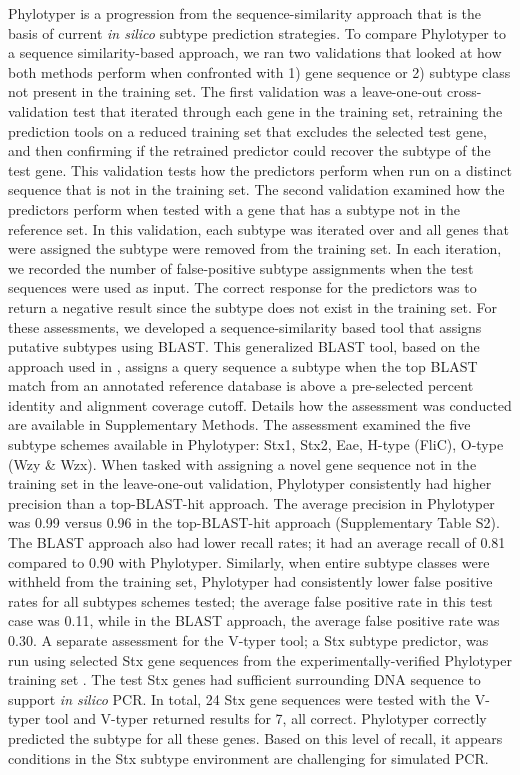 \documentclass{bioinfo}
\begin{document}
Phylotyper is a progression from the sequence-similarity approach that is the basis of current \textit{in silico} subtype prediction strategies.
To compare Phylotyper to a sequence similarity-based approach, we ran two validations that looked at how both methods perform when confronted with 1) gene sequence or 2) subtype class not present in the training set.
The first validation was a leave-one-out cross-validation test that iterated through each gene in the training set, retraining the prediction tools on a reduced training set that excludes the selected test gene, and then confirming if the retrained predictor could recover the subtype of the test gene.
This validation tests how the predictors perform when run on a distinct sequence that is not in the training set.
The second validation examined how the predictors perform when tested with a gene that has a subtype not in the reference set.
In this validation, each subtype was iterated over and all genes that were assigned the subtype were removed from the training set.
In each iteration, we recorded the number of false-positive subtype assignments when the test sequences were used as input.
The correct response for the predictors was to return a negative result since the subtype does not exist in the training set.
For these assessments, we developed a sequence-similarity based tool that assigns putative subtypes using BLAST.
This generalized BLAST tool, based on the approach used in \citep{Joensen2015}, assigns a query sequence a subtype when the top BLAST match from an annotated reference database is above a pre-selected percent identity and alignment coverage cutoff.
Details how the assessment was conducted are available in Supplementary Methods.
The assessment examined the five subtype schemes available in Phylotyper: Stx1, Stx2, Eae, H-type (FliC), O-type (Wzy \& Wzx).
When tasked with assigning a novel gene sequence not in the training set in the leave-one-out validation, Phylotyper consistently had higher precision than a top-BLAST-hit approach.
The average precision in Phylotyper was 0.99 versus 0.96 in the top-BLAST-hit approach (Supplementary Table S2).
The BLAST approach also had lower recall rates; it had an average recall of 0.81 compared to 0.90 with Phylotyper.
Similarly, when entire subtype classes were withheld from the training set, Phylotyper had consistently lower false positive rates for all subtypes schemes tested; the average false positive rate in this test case was 0.11, while in the BLAST approach, the average false positive rate was 0.30.
A separate assessment for the V-typer tool; a Stx subtype predictor, was run using selected Stx gene sequences from the experimentally-verified Phylotyper training set \citep{CARRILLO2016}.
The test Stx genes had sufficient surrounding DNA sequence to support \textit{in silico} PCR.
In total, 24 Stx gene sequences were tested with the V-typer tool and V-typer returned results for 7, all correct.
Phylotyper correctly predicted the subtype for all these genes.
Based on this level of recall, it appears conditions in the Stx subtype environment are challenging for simulated PCR.
\end{document}
